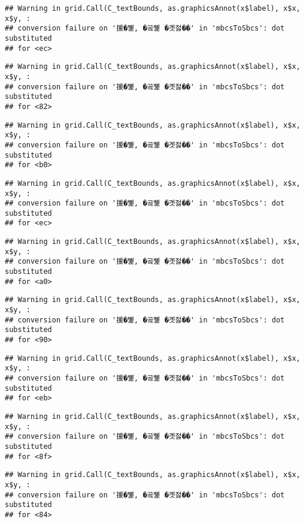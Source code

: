 \documentclass[
]{article}
\begin{document}
\begin{verbatim}
## Warning in grid.Call(C_textBounds, as.graphicsAnnot(x$label), x$x, x$y, :
## conversion failure on '援�뼱, �곸뼱 �곗젏��' in 'mbcsToSbcs': dot substituted
## for <ec>
\end{verbatim}

\begin{verbatim}
## Warning in grid.Call(C_textBounds, as.graphicsAnnot(x$label), x$x, x$y, :
## conversion failure on '援�뼱, �곸뼱 �곗젏��' in 'mbcsToSbcs': dot substituted
## for <82>
\end{verbatim}

\begin{verbatim}
## Warning in grid.Call(C_textBounds, as.graphicsAnnot(x$label), x$x, x$y, :
## conversion failure on '援�뼱, �곸뼱 �곗젏��' in 'mbcsToSbcs': dot substituted
## for <b0>
\end{verbatim}

\begin{verbatim}
## Warning in grid.Call(C_textBounds, as.graphicsAnnot(x$label), x$x, x$y, :
## conversion failure on '援�뼱, �곸뼱 �곗젏��' in 'mbcsToSbcs': dot substituted
## for <ec>
\end{verbatim}

\begin{verbatim}
## Warning in grid.Call(C_textBounds, as.graphicsAnnot(x$label), x$x, x$y, :
## conversion failure on '援�뼱, �곸뼱 �곗젏��' in 'mbcsToSbcs': dot substituted
## for <a0>
\end{verbatim}

\begin{verbatim}
## Warning in grid.Call(C_textBounds, as.graphicsAnnot(x$label), x$x, x$y, :
## conversion failure on '援�뼱, �곸뼱 �곗젏��' in 'mbcsToSbcs': dot substituted
## for <90>
\end{verbatim}

\begin{verbatim}
## Warning in grid.Call(C_textBounds, as.graphicsAnnot(x$label), x$x, x$y, :
## conversion failure on '援�뼱, �곸뼱 �곗젏��' in 'mbcsToSbcs': dot substituted
## for <eb>
\end{verbatim}

\begin{verbatim}
## Warning in grid.Call(C_textBounds, as.graphicsAnnot(x$label), x$x, x$y, :
## conversion failure on '援�뼱, �곸뼱 �곗젏��' in 'mbcsToSbcs': dot substituted
## for <8f>
\end{verbatim}

\begin{verbatim}
## Warning in grid.Call(C_textBounds, as.graphicsAnnot(x$label), x$x, x$y, :
## conversion failure on '援�뼱, �곸뼱 �곗젏��' in 'mbcsToSbcs': dot substituted
## for <84>
\end{verbatim}
\end{document}
